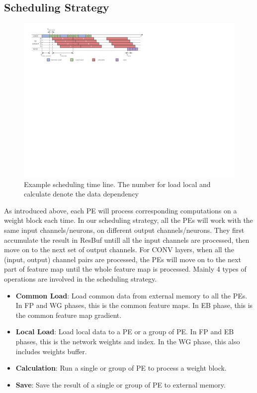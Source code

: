 \subsection{Scheduling Strategy}

\begin{figure}[t]
  \centering
  \includegraphics[width=1.8\columnwidth]{figures/schedule.pdf}
  \caption{Example scheduling time line. The number for load local and calculate denote the data dependency}
  \label{fig:sch}
\end{figure}

As introduced above, each PE will process corresponding computations on a weight block each time. In our scheduling strategy, all the PEs will work with the same input channels/neurons, on different output channels/neurons. They first accumulate the result in ResBuf untill all the input channels are processed, then move on to the next set of output channels. For CONV layers, when all the (input, output) channel pairs are processed, the PEs will move on to the next part of feature map until the whole feature map is processed. Mainly 4 types of operations are involved in the scheduling strategy.

\begin{itemize}
	\item {{\bf{Common Load}}: Load common data from external memory to all the PEs. In FP and WG phases, this is the common feature maps. In EB phase, this is the common feature map gradient.}
    \item {{\bf{Local Load}}: Load local data to a PE or a group of PE. In FP and EB phases, this is the network weights and index. In the WG phase, this also includes weights buffer.}
    \item {{\bf{Calculation}}: Run a single or group of PE to process a weight block.}
    \item {{\bf{Save}}: Save the result of a single or group of PE to external memory.}
\end{itemize}

